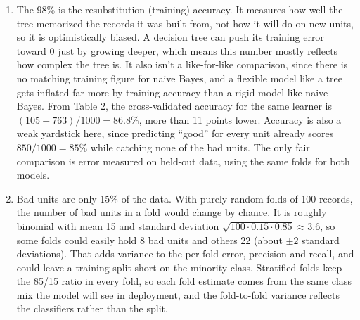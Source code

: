 \documentclass[12pt,letterpaper, onecolumn]{exam}
\begin{document}
\begin{questions}
\begin{solution}
        \begin{enumerate}[1.]
            \item The 98\% is the resubstitution (training) accuracy. It measures how well the tree memorized the records it was built from, not how it will do on new units, so it is optimistically biased. A decision tree can push its training error toward 0 just by growing deeper, which means this number mostly reflects how complex the tree is. It also isn't a like-for-like comparison, since there is no matching training figure for naive Bayes, and a flexible model like a tree gets inflated far more by training accuracy than a rigid model like naive Bayes. From Table 2, the cross-validated accuracy for the same learner is $(105+763)/1000 = 86.8\%$, more than 11 points lower. Accuracy is also a weak yardstick here, since predicting ``good'' for every unit already scores $850/1000 = 85\%$ while catching none of the bad units. The only fair comparison is error measured on held-out data, using the same folds for both models.

            \item Bad units are only 15\% of the data. With purely random folds of 100 records, the number of bad units in a fold would change by chance. It is roughly binomial with mean 15 and standard deviation $\sqrt{100\cdot 0.15\cdot 0.85}\approx 3.6$, so some folds could easily hold 8 bad units and others 22 (about $\pm 2$ standard deviations). That adds variance to the per-fold error, precision and recall, and could leave a training split short on the minority class. Stratified folds keep the 85/15 ratio in every fold, so each fold estimate comes from the same class mix the model will see in deployment, and the fold-to-fold variance reflects the classifiers rather than the split.


\end{enumerate}
\end{solution}
\end{questions}
\end{document}
